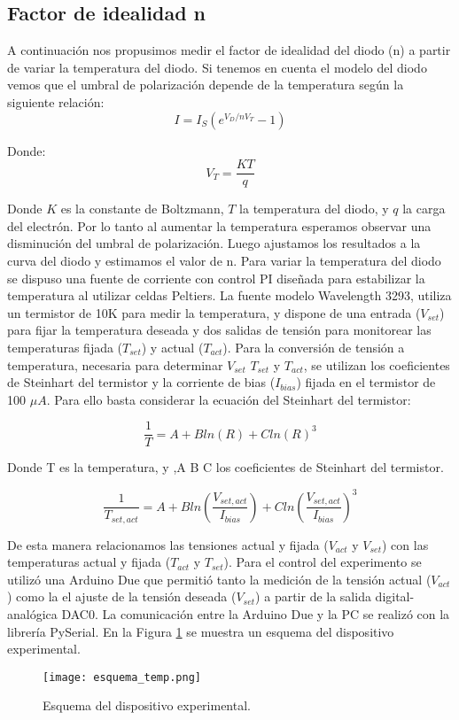 \documentclass[a4paper, 11pt]{article}
\begin{document}
\subsection*{Factor de idealidad n}
A continuación nos propusimos medir el factor de idealidad  del diodo (n) a partir de variar la temperatura del diodo. Si tenemos en cuenta el modelo del diodo vemos que el umbral de polarización depende de la temperatura según la siguiente relación:
\[
I=I_S(e^{V_D/nV_T}-1)
\]

Donde:
\[
V_T=\frac{KT}{q}
\]

Donde $K$ es la constante de Boltzmann, $T$ la temperatura del diodo, y $q$ la carga del electrón. Por lo tanto al aumentar la temperatura esperamos observar una disminución del umbral de polarización. Luego ajustamos los resultados a la curva del diodo y estimamos el valor de n.
Para variar la temperatura del diodo se dispuso una fuente de corriente con control PI diseñada para estabilizar la temperatura al utilizar celdas Peltiers. La fuente modelo Wavelength 3293, utiliza un termistor de 10K para medir la temperatura, y dispone de una entrada ($V_{set}$) para fijar la temperatura deseada y dos salidas de tensión para monitorear las temperaturas fijada ($T_{set}$) y actual ($T_{act}$). Para la conversión de tensión a temperatura, necesaria para determinar $V_{set}$ $T_{set}$ y $T_{act}$, se utilizan los coeficientes de Steinhart del termistor y la corriente de bias ($I_{bias}$) fijada en el termistor  de 100  ${\mu A}$. Para ello basta considerar la ecuación del Steinhart del termistor:

\[
\frac{1}{T} = A + Bln(R)+ Cln(R)^3
\]

Donde T es la temperatura, y ,A B C los coeficientes de Steinhart del termistor.

\[
\frac{1}{T_{set,act}} = A + Bln(\frac{V_{set,act}}{I_{bias}})+ Cln(\frac{V_{set,act}}{I_{bias}})^3
\]

De esta manera relacionamos las tensiones actual y fijada ($V_{act}$ y $V_{set}$) con las temperaturas actual y fijada ($T_{act}$ y $T_{set}$). Para el control del experimento se utilizó una Arduino Due que permitió tanto la medición de la tensión actual ($V_{act}$) como la el ajuste de la tensión deseada ($V_{set}$) a partir de la salida digital-analógica DAC0.  La comunicación entre la Arduino Due y la PC se realizó con la librería PySerial. En la Figura \ref{fig:esquema_temp} se muestra un esquema del dispositivo experimental.

\begin{figure} [H]
\centering
\texttt{[image: esquema\_temp.png]}
\caption{ Esquema del dispositivo experimental. \label{fig:esquema_temp}}
\end{figure} 
\end{document}
